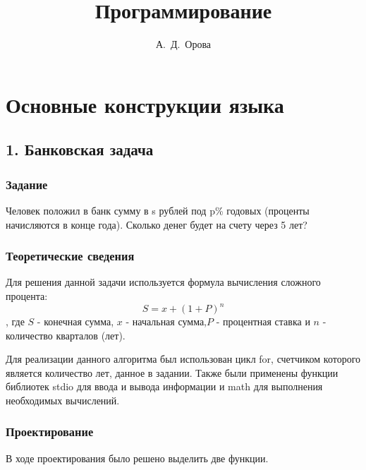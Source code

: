 \documentclass[12pt,a4paper]{report}
\author{А.~Д.~Орова}
\title{Программирование}
\begin{document}
\listoftodos
\maketitle
\tableofcontents{}

\chapter{Основные конструкции языка}
\section{1. Банковская задача}
\subsection{Задание}
\hspace{\parindent}
Человек положил в банк сумму в s рублей под p\% годовых (проценты начисляются в конце года). Сколько денег будет на счету через 5 лет? 

\subsection{Теоретические сведения}
\hspace{\parindent}
Для решения данной задачи используется формула вычисления сложного процента: \begin{displaymath} S = x + (1 + P)^{n}  \end{displaymath}, где $S$ - конечная сумма, $x$ - начальная сумма,$P$ - процентная ставка и $n$ - количество кварталов (лет).

Для реализации данного алгоритма был использован цикл for, счетчиком которого является
количество лет, данное в задании. Также были применены
  функции библиотек stdio для ввода и вывода информации и math для выполнения необходимых вычислений.


\subsection{Проектирование}
\hspace{\parindent}
В ходе проектирования было решено выделить две функции.
\end{document}
